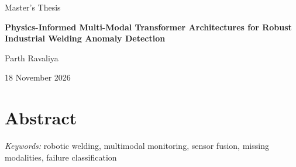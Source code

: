 \documentclass[12pt,a4paper,oneside]{report}
\newcommand{\apaprose}{\doublespacing\raggedright\setlength{\parindent}{0.5in}}
\newcommand{\thesistitle}{Physics-Informed Multi-Modal Transformer Architectures for Robust Industrial Welding Anomaly Detection}
\begin{document}
\ifdefined\ThesisReviewCopy
\else
\hypersetup{pageanchor=false}
\begin{titlepage}
\centering
\vspace*{17mm}
{\large Master's Thesis\par}
\vspace{17mm}
{\LARGE\bfseries \thesistitle\par}
\vspace{23mm}
{\Large Parth Ravaliya\par}
\vfill
{\large 18 November 2026\par}
\vspace{8mm}
\end{titlepage}
\hypersetup{pageanchor=true}
\fi
\chapter*{Abstract}
\begingroup\apaprose
\vspace*{-\baselineskip}
\noindent

\textit{Keywords:} robotic welding, multimodal monitoring, sensor fusion, missing modalities, failure classification\par
\endgroup
\clearpage
\ifdefined\ThesisReviewCopy\else
\tableofcontents\listoffigures\listoftables
\clearpage{}
\fi
\apaprose










\ifdefined\ThesisReviewCopy\else

\clearpage
\printbibliography[heading=bibintoc,title={References}]
\appendix









\fi
\end{document}
